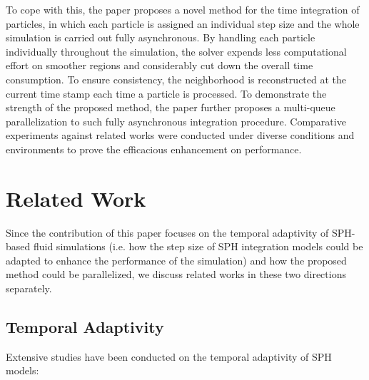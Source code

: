 \documentclass[
	11pt, 
	DIV10,
	ngerman,
	a4paper, 
	oneside, 
	headings=normal, 
	captions=tableheading,
	final, 
	numbers=noenddot
]{scrartcl}
\begin{document}
\par
To cope with this, the paper proposes a novel method for the time integration of particles, in which each particle is assigned an individual step size and the whole simulation is carried out fully asynchronous. By handling each particle individually throughout the simulation, the solver expends less computational effort on smoother regions and considerably cut down the overall time consumption. To ensure consistency, the neighborhood is reconstructed at the current time stamp each time a particle is processed. To demonstrate the strength of the proposed method, the paper further proposes a multi-queue parallelization to such fully asynchronous integration procedure. Comparative experiments against related works were conducted under diverse conditions and environments to prove the efficacious enhancement on performance.

\section{Related Work}

Since the contribution of this paper focuses on the temporal adaptivity of SPH-based fluid simulations (i.e. how the step size of SPH integration models could be adapted to enhance the performance of the simulation) and how the proposed method could be parallelized, we discuss related works in these two directions separately.

\subsection{Temporal Adaptivity}

Extensive studies have been conducted on the temporal adaptivity of SPH models:
\end{document}
